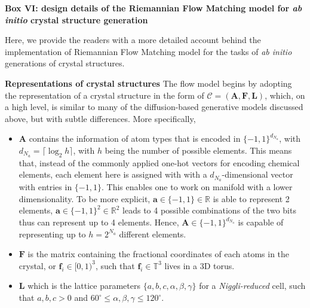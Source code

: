 \begin{myquote}
\textbf{Box VI: design details of the Riemannian Flow Matching model for \emph{ab initio} crystal structure generation }

\footnotesize

Here, we provide the readers with a more detailed account behind the implementation of Riemannian Flow Matching model for the tasks of \emph{ab initio} generations of crystal structures.

\hspace{10pt} \textbf{Representations of crystal structures} The flow model begins by adopting the representation of a crystal structure in the form of $\mathcal{C}=(\bm{A},\bm{F},\bm{L})$, which, on a high level, is similar to many of the diffusion-based generative models discussed above,\cite{jiao2023crystal,jiao2024space,zeni2025generative} but with subtle differences. More specifically, 
\begin{itemize}
    \item $\bm{A}$ contains the information of atom types that is encoded in $\{-1,1\}^{d_{N_a}}$, with ${d_{N_a}}=\lceil \log_2 h\rceil$, with $h$ being the number of possible elements. This means that, instead of the commonly applied one-hot vectors for encoding chemical elements, each element here is assigned with with a $d_{N_a}$-dimensional vector with entries in $\{-1,1\}$. This enables one to work on manifold with a lower dimensionality. To be more explicit, $\bm{a}\in\{-1,1\}\in\mathbb{R}$ is able to represent 2 elements, $\bm{a}\in\{-1,1\}^2\in\mathbb{R}^2$ leads to 4 possible combinations of the two bits thus can represent up to 4 elements. Hence, $\bm{A}\in\{-1,1\}^{d_{N_a}}$ is capable of representing up to $h=2^{N_a}$ different elements.
    \item $\bm{F}$ is the matrix containing the fractional coordinates  of each atoms in the crystal, or $\bm{f}_i\in[0,1)^3$, such that $\bm{f}_i\in\mathbb{T}^3$ lives in a 3D torus.
    \item $\bm{L}$ which is the lattice parameters $\{a,b,c,\alpha,\beta,\gamma\}$ for a \emph{Niggli-reduced} cell, such that $a,b,c>0$ and $60^\circ\leq\alpha,\beta,\gamma\leq 120^\circ$.
\end{itemize}


\end{myquote}
